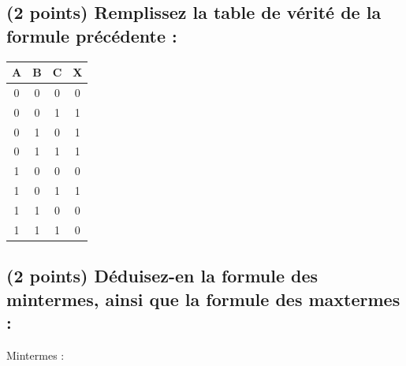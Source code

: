 \documentclass[11pt,a4paper]{article}
\begin{document}
\begin{table}[!ht]
  \centering
  \begin{minipage}{0.50\textwidth}
    \centering

\subsection{(2 points) Remplissez la table de vérité de la formule précédente : }

\bigskip

\bigskip

\begin{center}
\begin{tabular}{|c|c|c||c|}
\hline
\cellcolor{black!15} \textbf{A} & \cellcolor{black!15} \textbf{B} & \cellcolor{black!15} \textbf{C} &  \cellcolor{black!15} \textbf{X} \\
\hline
\hline
0 & 0 & 0  &  \cellcolor{black!15} 0 \\ \hline
0 & 0 & 1  &  \cellcolor{black!15} 1 \\ \hline
0 & 1 & 0  &  \cellcolor{black!15} 1 \\ \hline
0 & 1 & 1  &  \cellcolor{black!15} 1 \\ \hline
1 & 0 & 0  &  \cellcolor{black!15} 0 \\ \hline
1 & 0 & 1  &  \cellcolor{black!15} 1 \\ \hline
1 & 1 & 0  &  \cellcolor{black!15} 0 \\ \hline
1 & 1 & 1  &  \cellcolor{black!15} 0 \\ \hline
\end{tabular}
\end{center}

\bigskip

  \end{minipage}
  \hfillx
  \begin{minipage}{0.50\textwidth}

\subsection{(2 points) Déduisez-en la formule des mintermes, ainsi que la formule des maxtermes : }

\bigskip

Mintermes :



\end{minipage}
\end{table}
\end{document}
